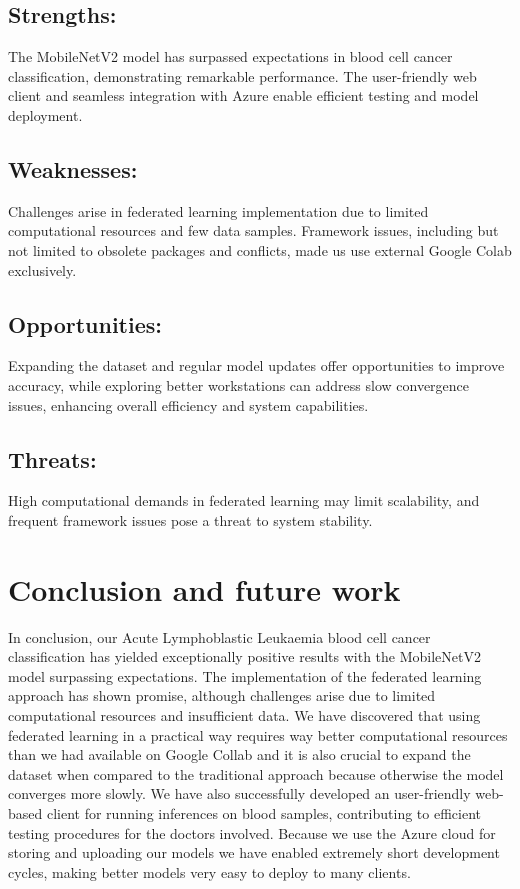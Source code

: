 \documentclass[runningheads,a4paper,11pt]{report}
\begin{document}
\section*{Strengths:}
The MobileNetV2\cite{sandler2018mobilenetv2} model has surpassed expectations in blood cell cancer classification, demonstrating remarkable performance. The user-friendly web client and seamless integration with Azure enable efficient testing and model deployment.

\section*{Weaknesses:}
Challenges arise in federated learning implementation due to limited computational resources and few data samples. Framework issues, including but not limited to obsolete packages and conflicts, made us use external Google Colab exclusively.

\section*{Opportunities:}
Expanding the dataset and regular model updates offer opportunities to improve accuracy, while exploring better workstations can address slow convergence issues, enhancing overall efficiency and system capabilities.

\section*{Threats:}
High computational demands in federated learning may limit scalability, and frequent framework issues pose a threat to system stability.

\chapter{Conclusion and future work}
\label{chapter:concl}

In conclusion, our Acute Lymphoblastic Leukaemia​ blood cell cancer classification has yielded exceptionally positive results with the MobileNetV2\cite{sandler2018mobilenetv2}  model surpassing expectations. The implementation of the federated learning approach has shown promise, although challenges arise due to limited computational resources and insufficient data. We have discovered that using federated learning in a practical way requires way better computational resources than we had available on Google Collab and it is also crucial to expand the dataset when compared to the traditional approach because otherwise the model converges more slowly.
We have also successfully developed an user-friendly web-based client for running inferences on blood samples, contributing to efficient testing procedures for the doctors involved. Because we use  the Azure cloud for storing and uploading our models we have enabled extremely short development cycles, making better models very easy to deploy to many clients.
\end{document}
